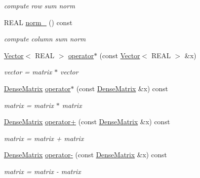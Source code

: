 \begin{DoxyCompactItemize}
\begin{DoxyCompactList}\small\item\em compute row sum norm \item\end{DoxyCompactList}\item 
\hypertarget{classhdnum_1_1DenseMatrix_abff8476e13341659ce2fcb6145dd351b}{
REAL \hyperlink{classhdnum_1_1DenseMatrix_abff8476e13341659ce2fcb6145dd351b}{norm\_} () const }
\label{classhdnum_1_1DenseMatrix_abff8476e13341659ce2fcb6145dd351b}

\begin{DoxyCompactList}\small\item\em compute column sum norm \item\end{DoxyCompactList}\item 
\hyperlink{classhdnum_1_1Vector}{Vector}$<$ REAL $>$ \hyperlink{classhdnum_1_1DenseMatrix_a6c43e793e3c9d91b1c216137a26f9ab7}{operator$\ast$} (const \hyperlink{classhdnum_1_1Vector}{Vector}$<$ REAL $>$ \&x)
\begin{DoxyCompactList}\small\item\em vector = matrix $\ast$ vector \item\end{DoxyCompactList}\item 
\hyperlink{classhdnum_1_1DenseMatrix}{DenseMatrix} \hyperlink{classhdnum_1_1DenseMatrix_a32bf5f7e4113e65aaeee04177d22a522}{operator$\ast$} (const \hyperlink{classhdnum_1_1DenseMatrix}{DenseMatrix} \&x) const 
\begin{DoxyCompactList}\small\item\em matrix = matrix $\ast$ matrix \item\end{DoxyCompactList}\item 
\hyperlink{classhdnum_1_1DenseMatrix}{DenseMatrix} \hyperlink{classhdnum_1_1DenseMatrix_ab31d1c60b8078d01bd131e36a486f091}{operator+} (const \hyperlink{classhdnum_1_1DenseMatrix}{DenseMatrix} \&x) const 
\begin{DoxyCompactList}\small\item\em matrix = matrix + matrix \item\end{DoxyCompactList}\item 
\hyperlink{classhdnum_1_1DenseMatrix}{DenseMatrix} \hyperlink{classhdnum_1_1DenseMatrix_a0579e65186e9f546b40d718ec7502afd}{operator-\/} (const \hyperlink{classhdnum_1_1DenseMatrix}{DenseMatrix} \&x) const 
\begin{DoxyCompactList}\small\item\em matrix = matrix -\/ matrix \item\end{DoxyCompactList}\end{DoxyCompactItemize}
